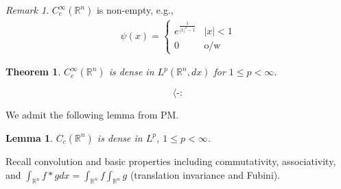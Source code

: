 \documentclass{article}
\theoremstyle{definition}
\theoremstyle{remark}
\newtheorem{rem}{Remark}
\theoremstyle{plain}
\newtheorem{lem}[defn]{Lemma}
\newtheorem{thm}[defn]{Theorem}
\newcommand{\RR}{\mathbb{R}}
\begin{document}
\begin{rem}
    $C_c^\infty(\RR^n)$ is non-empty, e.g.,
    \begin{align*}
        \psi(x)=\begin{cases}
            e^{\frac{1}{|x|^2-1}} & |x|<1\\
            0 & \text{o/w}
        \end{cases}
    \end{align*}
\end{rem}
\begin{thm}
    $C^\infty_c(\RR^n)$ is dense in $L^p(\RR^n,dx)$ for $1\le p<\infty$.
\end{thm}

\[\langle\text{-}:\tag{Owen's signature}\]

We admit the following lemma from PM.
\begin{lem}
    $C_c(\RR^n)$ is dense in $L^p$, $1\le p<\infty$.
\end{lem}
Recall convolution and basic properties including commutativity, associativity, and $\int_{\RR^n}f\ast gdx=\int_{\RR^n}f\int_{\RR^n}g$ (translation invariance and Fubini).
\end{document}
